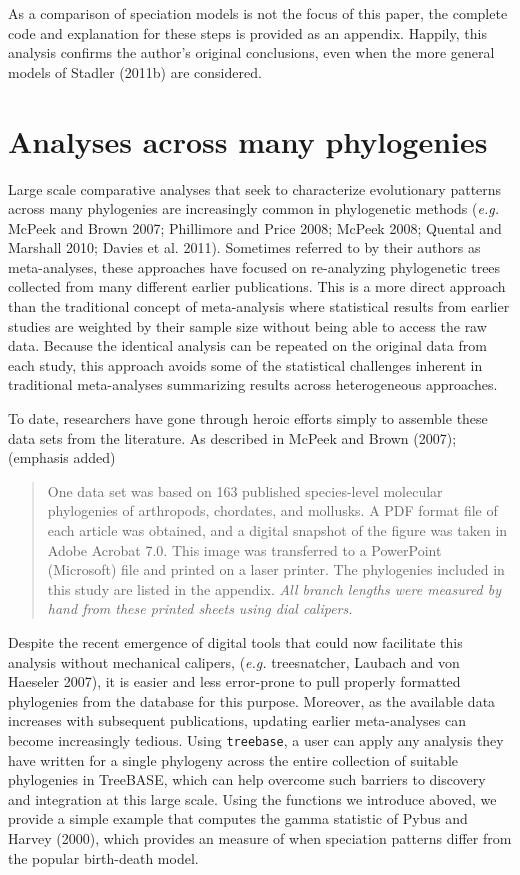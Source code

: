 As a comparison of speciation models is not the focus of this paper, the
complete code and explanation for these steps is provided as an
appendix. Happily, this analysis confirms the author's original
conclusions, even when the more general models of Stadler (2011b) are
considered.

\section{Analyses across many phylogenies}

Large scale comparative analyses that seek to characterize evolutionary
patterns across many phylogenies are increasingly common in phylogenetic
methods (\emph{e.g.} McPeek and Brown 2007; Phillimore and Price 2008;
McPeek 2008; Quental and Marshall 2010; Davies et al. 2011). Sometimes
referred to by their authors as meta-analyses, these approaches have
focused on re-analyzing phylogenetic trees collected from many different
earlier publications. This is a more direct approach than the
traditional concept of meta-analysis where statistical results from
earlier studies are weighted by their sample size without being able to
access the raw data. Because the identical analysis can be repeated on
the original data from each study, this approach avoids some of the
statistical challenges inherent in traditional meta-analyses summarizing
results across heterogeneous approaches.

To date, researchers have gone through heroic efforts simply to assemble
these data sets from the literature. As described in McPeek and Brown
(2007); (emphasis added)

\begin{quote}
One data set was based on 163 published species-level molecular
phylogenies of arthropods, chordates, and mollusks. A PDF format file of
each article was obtained, and a digital snapshot of the figure was
taken in Adobe Acrobat 7.0. This image was transferred to a PowerPoint
(Microsoft) file and printed on a laser printer. The phylogenies
included in this study are listed in the appendix. \emph{All branch
lengths were measured by hand from these printed sheets using dial
calipers.}

\end{quote}
Despite the recent emergence of digital tools that could now facilitate
this analysis without mechanical calipers, (\emph{e.g.} treesnatcher,
Laubach and von Haeseler 2007), it is easier and less error-prone to
pull properly formatted phylogenies from the database for this purpose.
Moreover, as the available data increases with subsequent publications,
updating earlier meta-analyses can become increasingly tedious. Using
\texttt{treebase}, a user can apply any analysis they have written for a
single phylogeny across the entire collection of suitable phylogenies in
TreeBASE, which can help overcome such barriers to discovery and
integration at this large scale. Using the functions we introduce
aboved, we provide a simple example that computes the gamma statistic of
Pybus and Harvey (2000), which provides an measure of when speciation
patterns differ from the popular birth-death model.

